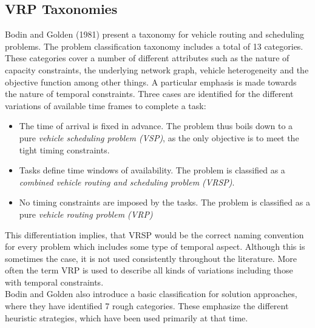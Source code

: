 \subsection{VRP Taxonomies}\label{sec:vrp-taxonomies}

Bodin and Golden (1981) \cite{bodin_classification_1981} present a taxonomy for vehicle routing and scheduling problems. The problem classification taxonomy includes a total of 13  categories. These categories cover a number of different attributes such as the nature of capacity constraints, the underlying network graph, vehicle heterogeneity and the objective function among other things. A particular emphasis is made towards the nature of temporal constraints. Three cases are identified for the different variations of available time frames to complete a task:
\begin{itemize}
\item The time of arrival is fixed in advance. The problem thus boils down to a pure \textit{vehicle scheduling problem (VSP)}, as the only objective is to meet the tight timing constraints.
\item Tasks define time windows of availability. The problem is classified as a \textit{combined vehicle routing and scheduling problem (VRSP)}.
\item No timing constraints are imposed by the tasks. The problem is classified as a pure \textit{vehicle routing problem (VRP)}
\end{itemize}
This differentiation implies, that VRSP would be the correct naming convention for every problem which includes some type of temporal aspect. Although this is sometimes the case, it is not used consistently throughout the literature. More often the term VRP is used to describe all kinds of variations including those with temporal constraints.\\
Bodin and Golden also introduce a basic classification for solution approaches, where they have identified 7 rough categories. These emphasize the different heuristic strategies, which have been used primarily at that time.\\ \\
